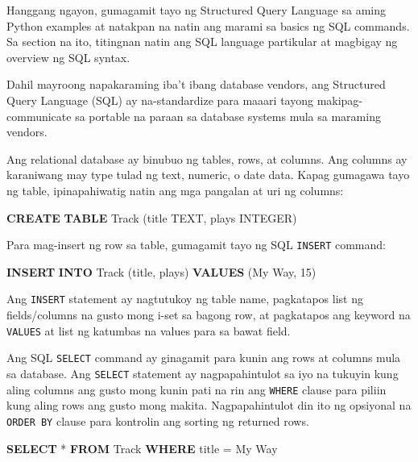 \documentclass[10pt,]{book}
\newenvironment{Shaded}{}{}
\newcommand{\DataTypeTok}[1]{\textcolor[rgb]{0.56,0.13,0.00}{#1}}
\newcommand{\DecValTok}[1]{\textcolor[rgb]{0.25,0.63,0.44}{#1}}
\newcommand{\KeywordTok}[1]{\textcolor[rgb]{0.00,0.44,0.13}{\textbf{#1}}}
\newcommand{\NormalTok}[1]{#1}
\newcommand{\OperatorTok}[1]{\textcolor[rgb]{0.40,0.40,0.40}{#1}}
\newcommand{\StringTok}[1]{\textcolor[rgb]{0.25,0.44,0.63}{#1}}
\begin{document}
  Hanggang ngayon, gumagamit tayo ng
Structured Query Language sa aming Python examples at natakpan na natin
ang marami sa basics ng SQL commands. Sa section na ito, titingnan natin
ang SQL language partikular at magbigay ng overview ng SQL syntax.

Dahil mayroong napakaraming iba't ibang database vendors, ang Structured
Query Language (SQL) ay na-standardize para maaari tayong
makipag-communicate sa portable na paraan sa database systems mula sa
maraming vendors.

Ang relational database ay binubuo ng tables, rows, at columns. Ang
columns ay karaniwang may type tulad ng text, numeric, o date data.
Kapag gumagawa tayo ng table, ipinapahiwatig natin ang mga pangalan at
uri ng columns:

\begin{Shaded}
\begin{Highlighting}[]
\KeywordTok{CREATE} \KeywordTok{TABLE}\NormalTok{ Track (title TEXT, plays }\DataTypeTok{INTEGER}\NormalTok{)}
\end{Highlighting}
\end{Shaded}

Para mag-insert ng row sa table, gumagamit tayo ng SQL \texttt{INSERT}
command:

\begin{Shaded}
\begin{Highlighting}[]
\KeywordTok{INSERT} \KeywordTok{INTO}\NormalTok{ Track (title, plays) }\KeywordTok{VALUES}\NormalTok{ (}\StringTok{\textquotesingle{}My Way\textquotesingle{}}\NormalTok{, }\DecValTok{15}\NormalTok{)}
\end{Highlighting}
\end{Shaded}

Ang \texttt{INSERT} statement ay nagtutukoy ng table name, pagkatapos
list ng fields/columns na gusto mong i-set sa bagong row, at pagkatapos
ang keyword na \texttt{VALUES} at list ng katumbas na values para sa
bawat field.

Ang SQL \texttt{SELECT} command ay ginagamit para kunin ang rows at
columns mula sa database. Ang \texttt{SELECT} statement ay
nagpapahintulot sa iyo na tukuyin kung aling columns ang gusto mong
kunin pati na rin ang \texttt{WHERE} clause para piliin kung aling rows
ang gusto mong makita. Nagpapahintulot din ito ng opsiyonal na
\texttt{ORDER\ BY} clause para kontrolin ang sorting ng returned rows.

\begin{Shaded}
\begin{Highlighting}[]
\KeywordTok{SELECT} \OperatorTok{*} \KeywordTok{FROM}\NormalTok{ Track }\KeywordTok{WHERE}\NormalTok{ title }\OperatorTok{=} \StringTok{\textquotesingle{}My Way\textquotesingle{}}
\end{Highlighting}
\end{Shaded}
\end{document}
